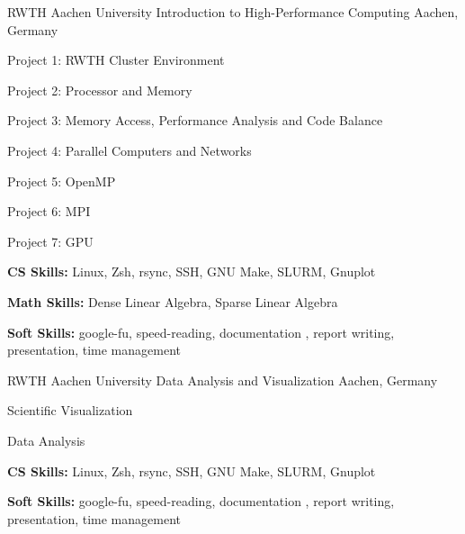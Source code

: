 

\begin{cventries}
  \cventry
    {RWTH Aachen University} %
    {Introduction to High-Performance Computing} %
    {Aachen, Germany} %
    {} %
    {
      \begin{cvitems} %
        \item {Project 1: RWTH Cluster Environment}
        \item {Project 2: Processor and Memory}
        \item {Project 3: Memory Access, Performance Analysis and Code Balance}
        \item {Project 4: Parallel Computers and Networks}
        \item {Project 5: OpenMP}
        \item {Project 6: MPI}
        \item {Project 7: GPU}
        \item {\textbf{CS Skills:} Linux, Zsh, rsync, SSH, GNU Make, SLURM, Gnuplot}
        \item {\textbf{Math Skills:} Dense Linear Algebra, Sparse Linear Algebra}
        \item {\textbf{Soft Skills:} google-fu, speed-reading, documentation , report writing, presentation, time management}
      \end{cvitems}
    }
  \cventry
    {RWTH Aachen University} %
    {Data Analysis and Visualization} %
    {Aachen, Germany} %
    {} %
    {
      \begin{cvitems} %
        \item {Scientific Visualization}
        \item {Data Analysis}
        \item {\textbf{CS Skills:} Linux, Zsh, rsync, SSH, GNU Make, SLURM, Gnuplot}
        \item {\textbf{Soft Skills:} google-fu, speed-reading, documentation , report writing, presentation, time management}

\end{cvitems}}
\end{cventries}
